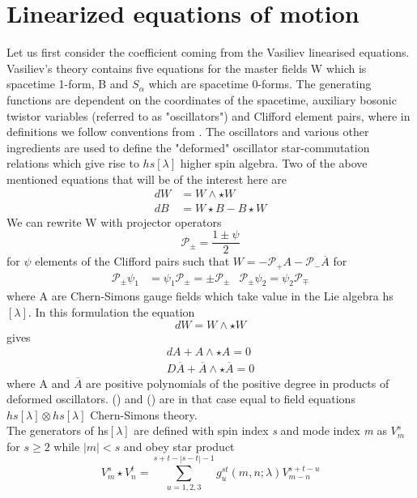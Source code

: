 \documentclass[prd,superscriptaddress,twocolumn,10pt]{revtex4}
\begin{document}
  \section{Linearized equations of motion}
Let us first consider the coefficient coming from the Vasiliev linearised equations. Vasiliev's theory contains five equations for the master fields W which is spacetime 1-form, B and $S_{\alpha}$ which are spacetime 0-forms. The generating functions are dependent on the coordinates of the spacetime, auxiliary bosonic twistor variables (referred to as "oscillators") and Clifford element pairs, where in definitions we follow conventions from .
The oscillators  and various other ingredients are used to define the "deformed" oscillator star-commutation relations which give rise to $hs[\lambda]$ higher spin algebra. 
Two of the above mentioned equations that will be of the interest here are
\begin{align}
dW&=W\wedge\star W \\
dB&=W\star B-B\star W 
\end{align}
We can rewrite W with projector operators 
\begin{equation}
\mathcal{P}_{\pm}=\frac{1\pm\psi}{2} 
\end{equation}
for $\psi$ elements of the Clifford pairs such that $W=-\mathcal{P}_{+}A-\mathcal{P}_{-}\overline{A}$
for 
\begin{align}
\mathcal{P}_{\pm}\psi_{1}&=\psi_1\mathcal{P}_{\pm}=\pm\mathcal{P}_{\pm} &\mathcal{P}_{\pm}\psi_2=\psi_2\mathcal{P}_{\mp}
\end{align}
where A are Chern-Simons gauge fields which take value in the Lie algebra hs$[\lambda]$. In this formulation the equation 
\begin{equation}
dW=W\wedge\star W
 \end{equation}
gives
\begin{align}
dA+A\wedge\star A =0 \\ 
D\overline{A}+\overline{A}\wedge \star \overline{A}=0 
\end{align}
where A and $\overline{A}$ are positive polynomials of the positive degree in products of deformed oscillators.
() and () are in that case equal to field equations $hs[\lambda]\otimes hs[\lambda]$  Chern-Simons theory. \\ 
The generators of hs$[\lambda]$ are defined with spin index \textit{s} and mode index \textit{m}  as
$V^s_{m}$ for $s\geq2 $
while $|m|<s$ and obey
 star product
\begin{equation}
V_m^s\star V_n^t=\sum_{u=1,2,3}^{s+t-|s-t|-1}g_u^{st}(m,n;\lambda)V^{s+t-u}_{m-n}
\end{equation}
\end{document}
